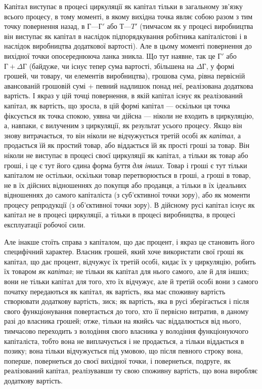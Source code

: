 Капітал виступає в процесі циркуляції як капітал тільки в
загальному зв’язку всього процесу, в тому моменті, в якому вихідна
точка являє собою разом з тим точку повернення назад, в $Г — Г'$ або $Т — T'$ (тимчасом як у процесі
виробництва він виступає як
капітал в наслідок підпорядкування робітника капіталістові і в
наслідок виробництва додаткової вартості). Але в цьому моменті
повернення до вихідної точки опосереднююча ланка зникла.
Що тут наявне, так це $Г'$ або $Г + ΔГ$ (байдуже, чи існує тепер
сума вартості, збільшена на $ΔГ$, у формі грошей, чи товару,
чи елементів виробництва), грошова сума, рівна первісній авансованій
грошовій сумі + певний надлишок понад неї, реалізована
додаткова вартість. І якраз у цій точці повернення, в якій
капітал існує як реалізований капітал, як вартість, що зросла,
в цій формі капітал — оскільки ця точка фіксується як точка
спокою, уявна чи дійсна — ніколи не входить в циркуляцію,
а, навпаки, є вилученим з циркуляції, як результат усього процесу.
Якщо він знову витрачається, то він ніколи не відчужується
третій особі \emph{як капітал}, а продається їй як простий
товар, або віддається їй як прості гроші за товар. Він ніколи
не виступає в процесі своєї циркуляції як капітал, а тільки як
товар або гроші, і це є тут його єдина форма буття \emph{для інших}.
Товар і гроші є тут тільки капіталом не остільки, оскільки
товар перетворюється в гроші, а гроші в товар, не в їх дійсних
відношеннях до покупця або продавця, а тільки в їх ідеальних
відношеннях до самого капіталіста (з суб’єктивної точки зору),
або як моменти процесу репродукції (з об’єктивної точки зору).
В дійсному русі капітал існує як капітал не в процесі циркуляції,
а тільки в процесі виробництва, в процесі експлуатації робочої
сили.

Але інакше стоїть справа з капіталом, що дає процент, і якраз
це становить його специфічний характер. Власник грошей,
який хоче використати свої гроші як капітал, що дає процент,
відчужує їх третій особі, кидає їх у циркуляцію, робить їх товаром
\emph{як капітал}; не тільки як капітал для нього самого, але
й для інших; вони не тільки капітал для того, хто їх відчужує,
але й третій особі вони з самого початку передаються як
капітал, як вартість, яка має споживну вартість створювати
додаткову вартість, зиск; як вартість, яка в русі зберігається
і після свого функціонування повертається до того, хто її первісно
витратив, в даному разі до власника грошей; отже, тільки
на якийсь час віддалюється від нього, тимчасово переходить з
володіння свого власника у володіння функціонуючого капіталіста,
тобто вона не виплачується і не продається, а тільки віддається
в позику; вона тільки відчужується під умовою, що
після певного строку вона, поперше, повернеться до своєї вихідної
точки, і повернеться, подруге, як реалізований капітал,
реалізувавши ту свою споживну вартість, що вона виробляє додаткову
вартість.

